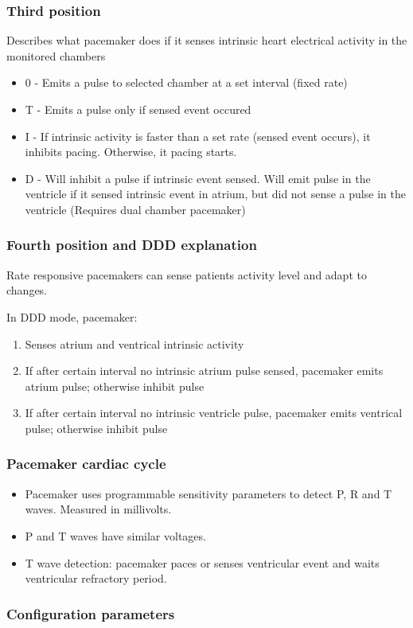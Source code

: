 \documentclass[xcolor=dvipsnames]{beamer}
\begin{document}
  \begin{frame}
    \frametitle{Third position}
    Describes what pacemaker does if it senses intrinsic heart electrical activity in the monitored chambers
  \begin{itemize}
    \item 0 - Emits a pulse to selected chamber at a set interval (fixed rate)
    \item T - Emits a pulse only if sensed event occured
    \item I - If intrinsic activity is faster than a set rate (sensed event occurs), it inhibits pacing. Otherwise, it pacing starts.
    \item D - Will inhibit a pulse if intrinsic event sensed. Will emit pulse in the ventricle if it sensed intrinsic event in atrium, but did not sense a pulse in the ventricle (Requires dual chamber pacemaker)
  \end{itemize}

  \end{frame}

  \begin{frame}
    \frametitle{Fourth position and DDD explanation}
    Rate responsive pacemakers can sense patients activity level and adapt to changes.\par
    
    \hrulefill\par 
    In DDD mode, pacemaker:
    \begin{enumerate}
      \item Senses atrium and ventrical intrinsic activity
      \item If after certain interval no intrinsic atrium pulse sensed, pacemaker emits atrium pulse; otherwise inhibit pulse
      \item If after certain interval no intrinsic ventricle pulse, pacemaker emits ventrical pulse; otherwise inhibit pulse
    \end{enumerate}

  \end{frame}

  \begin{frame}
    \frametitle{Pacemaker cardiac cycle}
    \begin{itemize}
      \item Pacemaker uses programmable sensitivity parameters to detect P, R and T waves. Measured in millivolts.
      \item P and T waves have similar voltages.
      \item T wave detection: pacemaker paces or senses ventricular event and waits ventricular refractory period.
    \end{itemize}
  \end{frame}
  
  \begin{frame}
    \frametitle{Configuration parameters}

  \end{frame}
\end{document}
